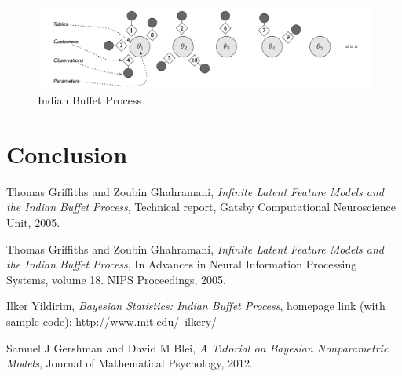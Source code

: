 \documentclass[11pt]{article}
\begin{document}
\begin{figure}
\includegraphics[width=\linewidth]{IBP.png}
\caption {Indian Buffet Process}
\label{fig:IBP}
\end{figure}

\section{Conclusion}

\newpage
\begin{thebibliography}{9}

  Thomas Griffiths and Zoubin Ghahramani,
  \emph{Infinite Latent Feature Models and the Indian Buffet Process},
  Technical report, Gatsby Computational Neuroscience Unit, 
  2005.
  
  Thomas Griffiths and Zoubin Ghahramani,
  \emph{Infinite Latent Feature Models and the Indian Buffet Process},
  In Advances in Neural Information Processing Systems, volume 18. NIPS Proceedings,
  2005.
  
  Ilker Yildirim,
  \emph{Bayesian Statistics: Indian Buffet Process}, homepage link (with sample code): http://www.mit.edu/~ilkery/
  
  Samuel J Gershman and David M Blei,
  \emph{A Tutorial on Bayesian Nonparametric Models},
  Journal of Mathematical Psychology, 
  2012.

\end{thebibliography}
\end{document}
